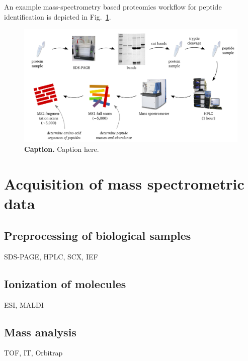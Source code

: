 An example mass-spectrometry based proteomics workflow for peptide identification
is depicted in Fig.~\ref{fig:proteomics-overview}.

\begin{figure}
\includegraphics[width=\textwidth]{figures/Proteomics.jpg}
\caption{
{\bf Caption.} 
Caption here.
}
\label{fig:proteomics-overview}
\end{figure}

\section{Acquisition of mass spectrometric data}

\subsection{Preprocessing of biological samples}

\begin{todo}
SDS-PAGE, HPLC, SCX, IEF
\end{todo}

\subsection{Ionization of molecules}

\begin{todo}
ESI, MALDI
\end{todo}

\subsection{Mass analysis}

\begin{todo}
TOF, IT, Orbitrap
\end{todo}

